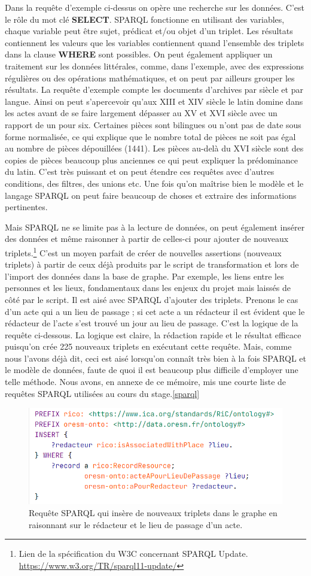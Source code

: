 Dans la requête d'exemple ci-dessus on opère une recherche sur les données. C'est le rôle du mot clé \textbf{SELECT}. SPARQL fonctionne en utilisant des variables, chaque variable peut être sujet, prédicat et/ou objet d'un triplet. Les résultats contiennent les valeurs que les variables contiennent quand l'ensemble des triplets dans la clause \textbf{WHERE} sont possibles. On peut également appliquer un traitement sur les données littérales, comme, dans l'exemple, avec des expressions régulières ou des opérations mathématiques, et on peut par ailleurs grouper les résultats. La requête d'exemple compte les documents d'archives par siècle et par langue. Ainsi on peut s'apercevoir qu'aux \textsc{XIII}\ieme{} et \textsc{XIV}\ieme{} siècle le latin domine dans les actes avant de se faire largement dépasser au \textsc{XV}\ieme{} et \textsc{XVI}\ieme{} siècle avec un rapport de un pour six. Certaines pièces sont bilingues ou n'ont pas de date sous forme normalisée, ce qui explique que le nombre total de pièces ne soit pas égal au nombre de pièces dépouillées (1441). Les pièces au-delà du \textsc{XVI}\ieme{}  siècle sont des copies de pièces beaucoup plus anciennes ce qui peut expliquer la prédominance du latin. C'est très puissant et on peut étendre ces requêtes avec d'autres conditions, des filtres, des unions etc. Une fois qu'on maîtrise bien le modèle et le langage SPARQL on peut faire beaucoup de choses et extraire des informations pertinentes.
\par
Mais SPARQL ne se limite pas à la lecture de données, on peut également insérer des données et même raisonner à partir de celles-ci pour ajouter de nouveaux triplets.\footnote{Lien de la spécification du W3C concernant SPARQL Update. \href{https://www.w3.org/TR/sparql11-update/}{https://www.w3.org/TR/sparql11-update/}} C'est un moyen parfait de créer de nouvelles assertions (nouveaux triplets) à partir de ceux déjà produits par le script de transformation et lors de l'import des données dans la base de graphe. Par exemple, les liens entre les personnes et les lieux, fondamentaux dans les enjeux du projet mais laissés de côté par le script. Il est aisé avec SPARQL d'ajouter des triplets. Prenons le cas d'un acte qui a un lieu de passage ; si cet acte a un rédacteur il est évident que le rédacteur de l'acte s'est trouvé un jour au lieu de passage. C'est la logique de la requête ci-dessous. La logique est claire, la rédaction rapide et le résultat efficace puisqu'on crée 225 nouveaux triplets en exécutant cette requête. Mais, comme nous l'avons déjà dit, ceci est aisé lorsqu'on connaît très bien à la fois SPARQL et le modèle de données, faute de quoi il est beaucoup plus difficile d'employer une telle méthode. Nous avons, en annexe de ce mémoire, mis une courte liste de requêtes SPARQL utilisées au cours du stage.\ref{sparql}
\begin{figure}[!h]
    \centering
    \includegraphics[width=0.9\linewidth]{images/insert redacteur.png}
    \caption{Requête SPARQL qui insère de nouveaux triplets dans le graphe en raisonnant sur le rédacteur et le lieu de passage d'un acte.}
    \label{fig:insert-redacteur}
\end{figure}